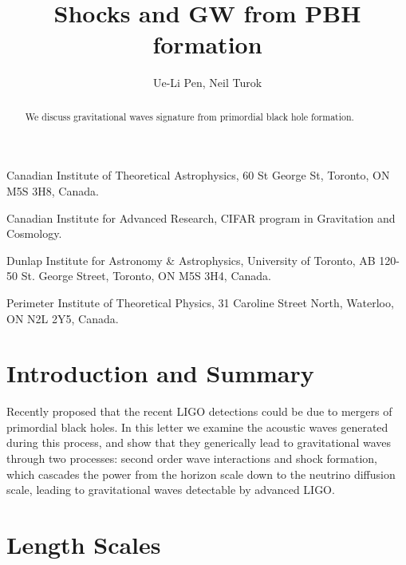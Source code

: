 \documentclass{nature}
\title{Shocks and GW from PBH formation}
\author{Ue-Li Pen, Neil Turok}
\begin{document}
\maketitle

\begin{affiliations}
\footnotesize{
\item {Canadian Institute of Theoretical Astrophysics, 60 St George St, Toronto, ON M5S 3H8, Canada.}
\item {Canadian Institute for Advanced Research, CIFAR program
  in Gravitation and Cosmology.}
\item {Dunlap Institute for Astronomy \& Astrophysics, University of Toronto, AB 120-50 St. George Street, Toronto, ON M5S 3H4, Canada.}
\item {Perimeter Institute of Theoretical Physics, 31 Caroline Street North, Waterloo, ON N2L 2Y5, Canada.}
}
\end{affiliations}

\begin{abstract}
We discuss gravitational waves signature from primordial black hole formation.
\end{abstract}


\section{Introduction and Summary}

Recently \cite{2016arXiv160300464B} proposed that the recent LIGO
detections\cite{2016PhRvL.116f1102A,2016PhRvL.116x1103A} could be due
to mergers of primordial black holes.  In this letter we examine the
acoustic waves generated during this process, and show that they
generically lead to gravitational waves through two processes: second
order wave interactions and shock formation, which cascades the power
from the horizon scale down to the neutrino diffusion scale, leading
to gravitational waves detectable by advanced LIGO.

\section{Length Scales}
\end{document}
